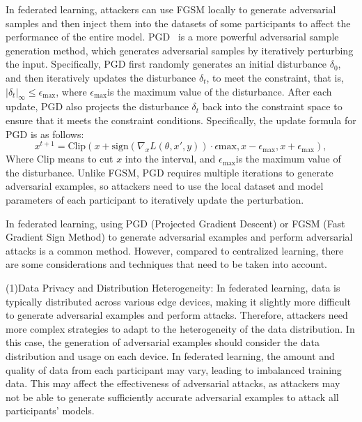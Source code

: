 \documentclass[pdflatex,sn-mathphys-num]{sn-jnl}%
\theoremstyle{thmstyleone}%
\theoremstyle{thmstyletwo}%
\theoremstyle{thmstylethree}%
\begin{document}
In federated learning, attackers can use FGSM locally
to generate adversarial samples and then inject them into
the datasets of some participants to affect the performance
of the entire model. PGD~\cite{madry2017towards} is a more powerful adversarial sample
generation method, which generates adversarial samples
by iteratively perturbing the input. Specifically, PGD
first randomly generates an initial disturbance $\delta_0$,
and then iteratively updates the disturbance $\delta_t$, to meet the constraint,
that is, $|\delta_t|_{\infty} \leq \epsilon_{\text{max}}$,
where $\epsilon_{\text{max}}$is the maximum value of the disturbance.
After each update, PGD also projects the disturbance
$\delta_t$ back into the constraint space to ensure that it meets the
constraint conditions.
Specifically, the update formula for PGD is as follows:
\begin{equation}
	x^{t+1} = \text{Clip}(x + \text{sign}(\nabla_x L(\theta,x',y)) \cdot \epsilon{\text{max}}, x - \epsilon_{\text{max}}, x + \epsilon_{\text{max}}),
\end{equation}
Where $\text{Clip}$ means to cut $x$ into the interval, and $\epsilon_ {\text{max}} $is the maximum value of the disturbance.
Unlike FGSM, PGD requires multiple iterations to generate adversarial examples,
so attackers need to use the local dataset and model parameters of each participant
to iteratively update the perturbation.

In federated learning, using PGD (Projected Gradient Descent) or FGSM
(Fast Gradient Sign Method) to generate adversarial examples and perform
adversarial attacks is a common method. However, compared to centralized
learning, there are some considerations and techniques that need to be
taken into account.

(1)Data Privacy and Distribution Heterogeneity: In
federated learning, data is typically distributed across
various edge devices, making it slightly more diﬀicult to
generate adversarial examples and perform attacks.
Therefore, attackers need more complex strategies to adapt to
the heterogeneity of the data distribution. In this case,
the generation of adversarial examples should consider the
data distribution and usage on each device. In federated
learning, the amount and quality of data from each
participant may vary, leading to imbalanced training data.
This may affect the effectiveness of adversarial attacks, as
attackers may not be able to generate suﬀiciently accurate
adversarial examples to attack all participants' models.
\end{document}
